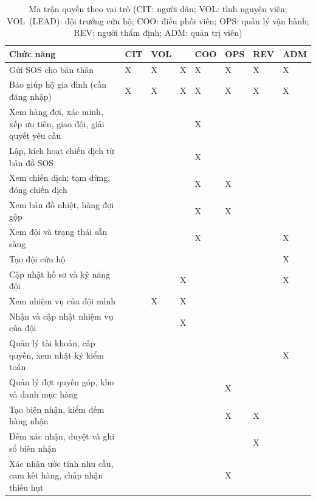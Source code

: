 \documentclass[12pt,a4paper,oneside]{report}
\begin{document}
\begin{table}[H]
  \centering
  \caption[Ma trận quyền theo vai trò]{Ma trận quyền theo vai trò (CIT: người dân; VOL: tình nguyện viên; \mbox{VOL (LEAD)}: đội trưởng cứu hộ; COO: điều phối viên; OPS: quản lý vận hành; REV: người thẩm định; ADM: quản trị viên)}\label{tab:rbac}
  \scriptsize
  \setlength{\tabcolsep}{3pt}
  \begin{tabularx}{\textwidth}{|Y|*{7}{>{\centering\arraybackslash}p{1.05cm}|}}
    \hline
    \textbf{Chức năng} & \textbf{CIT} & \textbf{VOL} & \textbf{} & \textbf{COO} & \textbf{OPS} & \textbf{REV} & \textbf{ADM} \\
    \hline
    Gửi SOS cho bản thân & X & X & X & X & X & X & X \\
    \hline
    Báo giúp hộ gia đình (cần đăng nhập) & X & X & X & X & X & X & X \\
    \hline
    Xem hàng đợi, xác minh, xếp ưu tiên, giao đội, giải quyết yêu cầu &  &  &  & X &  &  &  \\
    \hline
    Lập, kích hoạt chiến dịch từ bản đồ SOS &  &  &  & X &  &  &  \\
    \hline
    Xem chiến dịch; tạm dừng, đóng chiến dịch &  &  &  & X & X &  &  \\
    \hline
    Xem bản đồ nhiệt, hàng đợi gộp &  &  &  & X & X &  &  \\
    \hline
    Xem đội và trạng thái sẵn sàng &  &  &  & X &  &  & X \\
    \hline
    Tạo đội cứu hộ &  &  &  &  &  &  & X \\
    \hline
    Cập nhật hồ sơ và kỹ năng đội &  &  & X &  &  &  & X \\
    \hline
    Xem nhiệm vụ của đội mình &  & X & X &  &  &  &  \\
    \hline
    Nhận và cập nhật nhiệm vụ của đội &  &  & X &  &  &  &  \\
    \hline
    Quản lý tài khoản, cấp quyền, xem nhật ký kiểm toán &  &  &  &  &  &  & X \\
    \hline
    Quản lý đợt quyên góp, kho và danh mục hàng &  &  &  &  & X &  &  \\
    \hline
    Tạo biên nhận, kiểm đếm hàng nhận &  &  &  &  & X & X &  \\
    \hline
    Đếm xác nhận, duyệt và ghi sổ biên nhận &  &  &  &  &  & X &  \\
    \hline
    Xác nhận ước tính nhu cầu, cam kết hàng, chấp nhận thiếu hụt &  &  &  &  & X &  &  \\

\end{tabularx}
\end{table}
\end{document}
